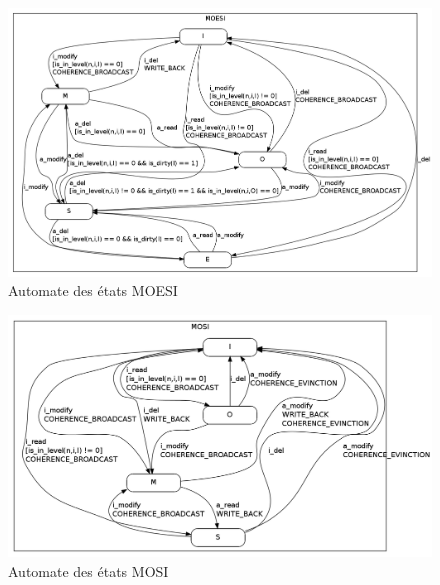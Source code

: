 \begin{figure}[!h]
\begin{center}
   \includegraphics[scale=0.35]{images/MOESI_simple.png}
   \caption{\label{img:state_moesi} Automate des états MOESI}
\end{center}
\end{figure}


\begin{figure}[!h]
\begin{center}
   \includegraphics[scale=0.4]{images/MOSI_simple.png}
   \caption{\label{img:state_mosi} Automate des états MOSI}
\end{center}
\end{figure}


